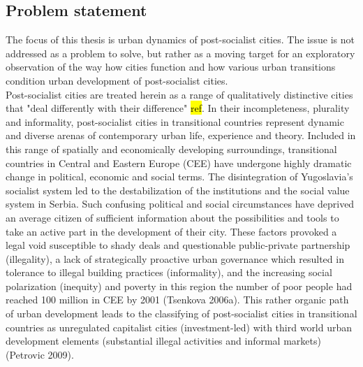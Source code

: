 \documentclass[11pt]{report}
\begin{document}
\subsection{Problem statement}
The focus of this thesis is urban dynamics of post-socialist cities. The issue is not addressed as a problem to solve, but rather as a moving target for an exploratory observation of the way how cities function and how various urban transitions condition urban development of post-socialist cities.
\\
Post-socialist cities are treated herein as a range of qualitatively distinctive cities that "deal differently with their difference" \hl{ref}. In their incompleteness, plurality and informality, post-socialist cities in transitional countries represent dynamic and diverse arenas of contemporary urban life, experience and theory. Included in this range of spatially and economically developing surroundings, transitional countries in Central and Eastern Europe (CEE) have undergone highly dramatic change in political, economic and social terms. The disintegration of Yugoslavia’s socialist system led to the destabilization of the institutions and the social value system in Serbia. Such confusing political and social circumstances have deprived an average citizen of sufficient information about the possibilities and tools to take an active part in the development of their city. These factors provoked a legal void susceptible to shady deals and questionable public-private partnership (illegality), a lack of strategically proactive urban governance which resulted in tolerance to illegal building practices (informality), and the increasing social polarization (inequity) and poverty in this region {the number of poor people had reached 100 million in CEE by 2001 (Tsenkova 2006a)}. This rather organic path of urban development leads to the classifying of post-socialist cities in transitional countries as unregulated capitalist cities (investment-led) with third world urban development elements (substantial illegal activities and informal markets) (Petrovic 2009).
\\
\end{document}
